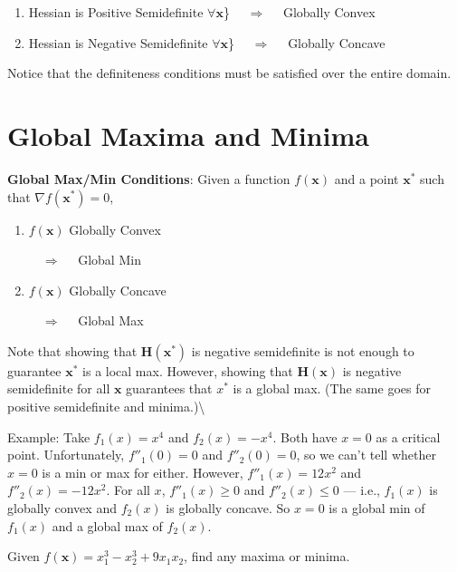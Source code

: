 \documentclass[]{book}
\providecommand{\tightlist}{%
  \setlength{\itemsep}{0pt}\setlength{\parskip}{0pt}}
\theoremstyle{definition}
\theoremstyle{definition}
\theoremstyle{definition}
\theoremstyle{remark}
\let\BeginKnitrBlock\begin \let\EndKnitrBlock\end
\begin{document}
\begin{enumerate}
\def\labelenumi{\arabic{enumi}.}
\tightlist
\item
  Hessian is Positive Semidefinite \(\forall \mathbf{x}\)\} \(\quad \Longrightarrow \quad\) Globally Convex
\item
  Hessian is Negative Semidefinite \(\forall \mathbf{x}\)\} \(\quad \Longrightarrow \quad\) Globally Concave
\end{enumerate}

Notice that the definiteness conditions must be satisfied over the entire domain.

\hypertarget{global-maxima-and-minima}{%
\section{Global Maxima and Minima}\label{global-maxima-and-minima}}

\textbf{Global Max/Min Conditions}: Given a function \(f(\mathbf{x})\) and a point \(\mathbf{x}^*\) such that \(\nabla f(\mathbf{x}^*)=0\),

\begin{enumerate}
  \item \parbox[t]{2in}{$f(\mathbf{x})$ Globally Convex} $\quad
\Longrightarrow \quad$ Global Min
  \item \parbox[t]{2in}{$f(\mathbf{x})$ Globally Concave} $\quad
\Longrightarrow \quad$ Global Max
\end{enumerate}

Note that showing that \(\mathbf{H(x^*)}\) is negative semidefinite is
not enough to guarantee \(\mathbf{x}^*\) is a local max. However, showing that
\(\mathbf{H(x)}\) is negative semidefinite for all \(\mathbf{x}\) guarantees that \(x^*\)
is a global max. (The same goes for positive semidefinite and minima.)\textbackslash{}

Example: Take \(f_1(x)=x^4\) and \(f_2(x)=-x^4\). Both have \(x=0\) as
a critical point. Unfortunately, \(f''_1(0)=0\) and \(f''_2(0)=0\), so we
can't tell whether \(x=0\) is a min or max for either. However,
\(f''_1(x)=12x^2\) and \(f''_2(x)=-12x^2\). For all \(x\), \(f''_1(x)\ge 0\)
and \(f''_2(x)\le 0\) --- i.e., \(f_1(x)\) is globally convex and \(f_2(x)\)
is globally concave. So \(x=0\) is a global min of \(f_1(x)\) and a
global max of \(f_2(x)\).

\BeginKnitrBlock{exercise}
\protect\hypertarget{exr:unnamed-chunk-59}{}{\label{exr:unnamed-chunk-59} }Given \(f(\mathbf{x})=x_1^3-x_2^3+9x_1x_2\), find any maxima or minima.
\EndKnitrBlock{exercise}
\end{document}
